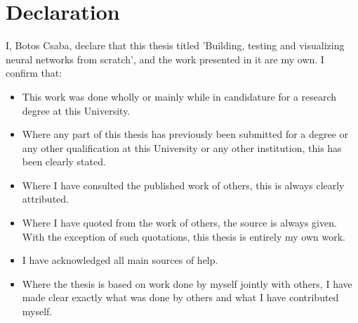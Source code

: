 \chapter*{Declaration}
I, Botos Csaba, declare that this thesis titled 'Building, testing and visualizing neural networks from scratch', and the work presented in it are my own. I confirm that:

\begin{itemize} 
\item This work was done wholly or mainly while in candidature for a research degree at this University.
 
\item Where any part of this thesis has previously been submitted for a degree or any other qualification at this University or any other institution, this has been clearly stated.
 
\item Where I have consulted the published work of others, this is always clearly attributed.
 
\item Where I have quoted from the work of others, the source is always given. With the exception of such quotations, this thesis is entirely my own work.
 
\item I have acknowledged all main sources of help.
 
\item Where the thesis is based on work done by myself jointly with others, I have made clear exactly what was done by others and what I have contributed myself.

\end{itemize}
